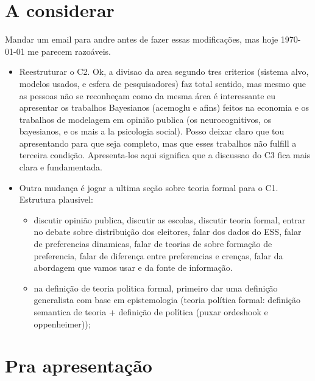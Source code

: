 \documentclass{article}
\begin{document}
\section*{A considerar}

Mandar um email para andre antes de fazer essas modificações, mas hoje \today
\hspace{0.1cm} me parecem razoáveis.

\begin{itemize}
\item Reestruturar o C2. Ok, a divisao da area segundo tres criterios (sistema
  alvo, modelos usados, e esfera de pesquisadores) faz total sentido, mas mesmo
  que as pessoas não se reconheçam como da mesma área é interessante eu
  apresentar os trabalhos Bayesianos (acemoglu e afins) feitos na economia e os trabalhos de
  modelagem em opinião publica (os neurocognitivos, os bayesianos, e os mais a
  la psicologia social). Posso deixar claro que tou apresentando para que seja
  completo, mas que esses trabalhos não fulfill a terceira condição.
  Apresenta-los aqui significa que a discussao do C3 fica mais clara e
  fundamentada.
\item Outra mudança é jogar a ultima seção sobre teoria formal para o C1.
  Estrutura plausivel:
  \begin{itemize}
  \item discutir opinião publica, discutir as escolas, discutir teoria formal,
    entrar no debate sobre distribuição dos eleitores, falar dos dados do
    ESS, falar de preferencias dinamicas, falar de teorias de sobre formação de
    preferencia, falar de diferença entre preferencias e crenças, falar da
   abordagem que vamos usar e da fonte de informação.
  \item na definição de teoria politica formal, primeiro dar uma definição
    generalista com base em epistemologia (teoria política formal: definição
    semantica de teoria + definição de política (puxar ordeshook e
    oppenheimer)); 
  \end{itemize}
\end{itemize}


\section*{Pra apresentação}
\end{document}
